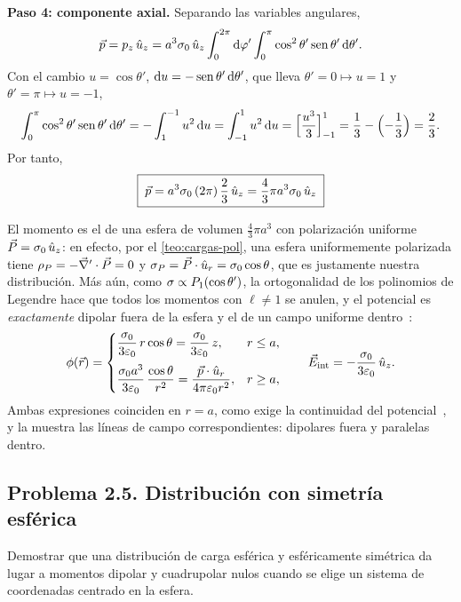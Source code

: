 \begin{resolucion}
\textbf{Paso 4: componente axial.} Separando las variables angulares,
\[
  \vec{p}=p_z\,\hat{u}_{z}=a^{3}\sigma_0\,\hat{u}_{z}\int_{0}^{2\pi}\mathrm{d}\varphi'\int_{0}^{\pi}\cos^{2}\theta'\operatorname{sen}\theta'\,\mathrm{d}\theta' .
\]
Con el cambio $u=\cos\theta'$, $\mathrm{d} u=-\operatorname{sen}\theta'\,\mathrm{d}\theta'$, que lleva $\theta'=0\mapsto u=1$ y $\theta'=\pi\mapsto u=-1$,
\[
  \int_{0}^{\pi}\cos^{2}\theta'\operatorname{sen}\theta'\,\mathrm{d}\theta'=-\int_{1}^{-1}u^{2}\,\mathrm{d} u=\int_{-1}^{1}u^{2}\,\mathrm{d} u=\Bigl[\frac{u^{3}}{3}\Bigr]_{-1}^{1}=\frac13-\Bigl(-\frac13\Bigr)=\frac23 .
\]
Por tanto,
\[
  \boxed{\;\vec{p}=a^{3}\sigma_0\,(2\pi)\,\frac23\,\hat{u}_{z}=\frac43\pi a^{3}\sigma_0\,\hat{u}_{z}\;}
\]
\end{resolucion}



\begin{observacion}\label{obs:sem-esfera-sigma}
El momento es el de una esfera de volumen $\frac43\pi a^{3}$ con polarización uniforme $\vec{P}=\sigma_0\,\hat{u}_{z}$: en efecto, por el \cref{teo:cargas-pol}, una esfera uniformemente polarizada
tiene $\rho_{P}=-\vec{\nabla}'\cdot\vec{P}=0$ y $\sigma_{P}=\vec{P}\cdot\hat{u}_{r}=\sigma_0\cos\theta$, que es justamente nuestra distribución. Más aún, como $\sigma\propto P_{1}(\cos\theta')$, la ortogonalidad de los
polinomios de Legendre hace que todos los momentos con $\ell\neq1$ se anulen, y el potencial es \emph{exactamente} dipolar fuera de la esfera y el de un campo uniforme
dentro~\cite{GRIFFITHS}:
\[
  \phi(\vec{r})=\begin{cases}\dfrac{\sigma_0}{3\varepsilon_{0}}\,r\cos\theta=\dfrac{\sigma_0}{3\varepsilon_{0}}\,z,& r\le a,\\[10pt]
  \dfrac{\sigma_0a^{3}}{3\varepsilon_{0}}\,\dfrac{\cos\theta}{r^{2}}=\dfrac{\vec{p}\cdot\hat{u}_{r}}{4\pi\varepsilon_{0} r^{2}},& r\ge a,\end{cases}
  \qquad \vec{E}_{\mathrm{int}}=-\frac{\sigma_0}{3\varepsilon_{0}}\,\hat{u}_{z} .
\]
Ambas expresiones coinciden en $r=a$, como exige la continuidad del potencial~\cite{TEMA1}, y la  muestra las líneas de campo
correspondientes: dipolares fuera y paralelas dentro.
\end{observacion}

\subsection{Problema 2.5. Distribución con simetría esférica}\label{sem:esfera-rho}
\begin{ejercicio}\label{ejer:esfera-rho}
Demostrar que una distribución de carga esférica y esféricamente simétrica da lugar a momentos dipolar y cuadrupolar nulos cuando se elige un sistema de coordenadas centrado en la
esfera.
\end{ejercicio}

